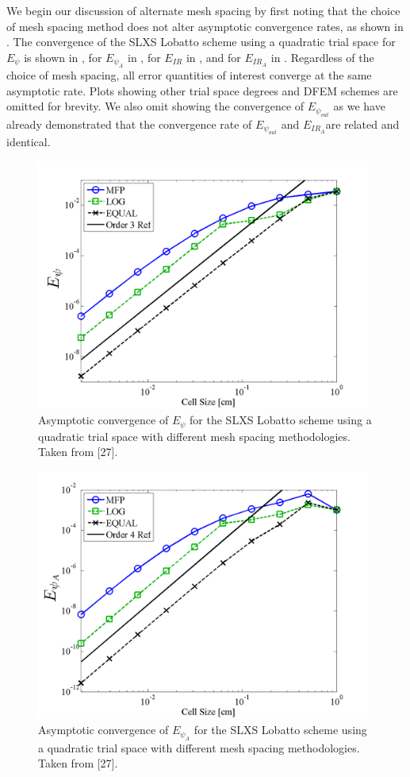 We begin our discussion of alternate mesh spacing by first noting that the choice of mesh spacing method does not alter asymptotic convergence rates, as shown in
.  
The convergence of the SLXS Lobatto scheme using a quadratic trial space for 
$E_{\psi}$ is shown in , 
for $E_{\psi_A}$ in , for $E_{IR}$ in , and for $E_{IR_A}$ 
in .
Regardless of the choice of mesh spacing, all error quantities of interest converge at the same asymptotic rate. 
Plots showing other trial space degrees and DFEM schemes are omitted for brevity.  
We also omit showing the convergence of $E_{\psi_{out}}$ as we have already demonstrated that the convergence rate of $E_{\psi_{out}}$ and $E_{IR_A}$are related and identical.
\begin{figure}[!htp]
\centering
\includegraphics[width=11cm]{chapter3_variable_xs/P2_LOBATTO_E_PSI.png}
\caption{Asymptotic convergence of $E_{\psi}$ for the SLXS Lobatto scheme using a quadratic trial space with different mesh spacing methodologies.  Taken from [27].}
\label{fig:lobatto_spacing_psi}
\end{figure}
%
%
\begin{figure}[!hbp]
\centering
\includegraphics[width=11cm]{chapter3_variable_xs/P2_LOBATTO_E_PSI_A.png}
\caption{Asymptotic convergence of $E_{\psi_A}$ for the SLXS Lobatto scheme using a quadratic trial space with different mesh spacing methodologies.  Taken from [27].}
\label{fig:lobatto_spacing_psi_A}
\end{figure}
